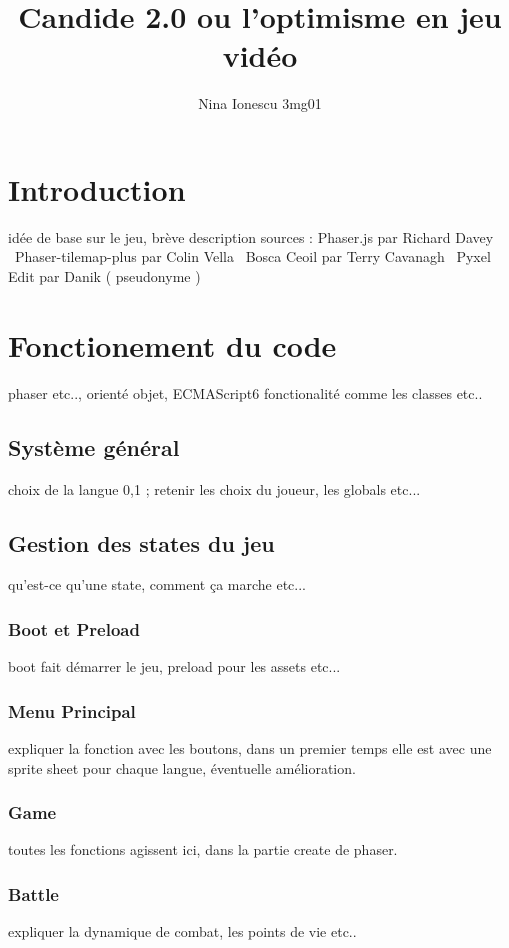 \documentclass[11pt]{article}
\begin{document}
\title{Candide 2.0 ou l'optimisme en jeu vidéo }
\author{Nina Ionescu 3mg01}
\date{}
\maketitle

\section{Introduction}
idée de base sur le jeu, brève description
sources : 
Phaser.js par Richard Davey \
Phaser-tilemap-plus par Colin Vella \
Bosca Ceoil par Terry Cavanagh \
Pyxel Edit par Danik ( pseudonyme ) 


\section{Fonctionement du code}
phaser etc.., orienté objet, ECMAScript6  fonctionalité comme les classes etc..
\subsection{Système général}
 choix de la langue 0,1 ; retenir les choix du joueur, les globals etc...
\subsection{Gestion des states du jeu}
qu'est-ce qu'une state, comment ça marche etc...
\subsubsection{Boot et Preload}
boot fait démarrer le jeu, preload pour les assets etc...
\subsubsection{Menu Principal}
expliquer la fonction avec les boutons, dans un premier temps elle est avec une sprite sheet pour chaque langue, éventuelle amélioration.

\subsubsection{Game}
toutes les fonctions agissent ici, dans la partie create de phaser.
\subsubsection{Battle}
expliquer la dynamique de combat, les points de vie etc..
\end{document}
